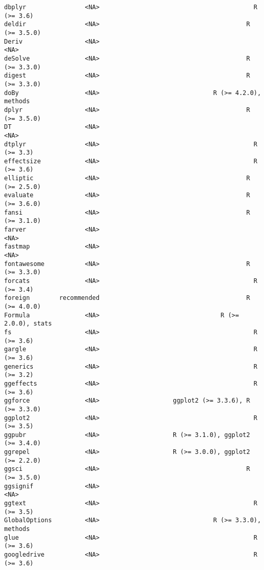\documentclass[
  letterpaper,
  DIV=11,
  numbers=noendperiod]{scrreprt}
\begin{document}
\begin{verbatim}
dbplyr                <NA>                                          R (>= 3.6)
deldir                <NA>                                        R (>= 3.5.0)
Deriv                 <NA>                                                <NA>
deSolve               <NA>                                        R (>= 3.3.0)
digest                <NA>                                        R (>= 3.3.0)
doBy                  <NA>                               R (>= 4.2.0), methods
dplyr                 <NA>                                        R (>= 3.5.0)
DT                    <NA>                                                <NA>
dtplyr                <NA>                                          R (>= 3.3)
effectsize            <NA>                                          R (>= 3.6)
elliptic              <NA>                                        R (>= 2.5.0)
evaluate              <NA>                                        R (>= 3.6.0)
fansi                 <NA>                                        R (>= 3.1.0)
farver                <NA>                                                <NA>
fastmap               <NA>                                                <NA>
fontawesome           <NA>                                        R (>= 3.3.0)
forcats               <NA>                                          R (>= 3.4)
foreign        recommended                                        R (>= 4.0.0)
Formula               <NA>                                 R (>= 2.0.0), stats
fs                    <NA>                                          R (>= 3.6)
gargle                <NA>                                          R (>= 3.6)
generics              <NA>                                          R (>= 3.2)
ggeffects             <NA>                                          R (>= 3.6)
ggforce               <NA>                    ggplot2 (>= 3.3.6), R (>= 3.3.0)
ggplot2               <NA>                                          R (>= 3.5)
ggpubr                <NA>                    R (>= 3.1.0), ggplot2 (>= 3.4.0)
ggrepel               <NA>                    R (>= 3.0.0), ggplot2 (>= 2.2.0)
ggsci                 <NA>                                        R (>= 3.5.0)
ggsignif              <NA>                                                <NA>
ggtext                <NA>                                          R (>= 3.5)
GlobalOptions         <NA>                               R (>= 3.3.0), methods
glue                  <NA>                                          R (>= 3.6)
googledrive           <NA>                                          R (>= 3.6)

\end{verbatim}
\end{document}

